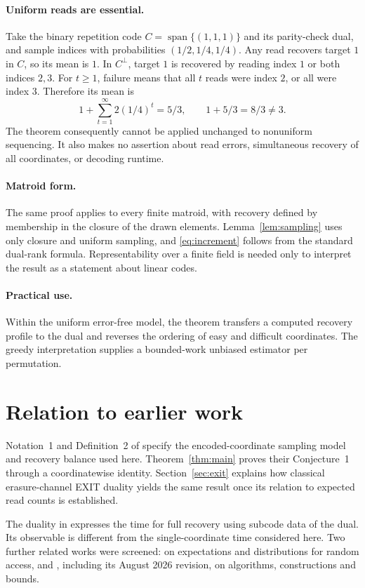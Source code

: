 \documentclass[11pt]{article}
\theoremstyle{remark}
\newcommand{\spn}{\operatorname{span}}
\begin{document}
\paragraph{Uniform reads are essential.}
Take the binary repetition code $C=\spn\{(1,1,1)\}$ and its parity-check
dual, and sample indices with probabilities $(1/2,1/4,1/4)$. Any read
recovers target $1$ in $C$, so its mean is $1$. In $C^\perp$, target $1$
is recovered by reading index $1$ or both indices $2,3$. For $t\geq1$,
failure means that all $t$ reads were index $2$, or all were index $3$.
Therefore its mean is
\[
 1+\sum_{t=1}^\infty 2(1/4)^t=5/3,
 \qquad 1+5/3=8/3\ne3.
\]
The theorem consequently cannot be applied unchanged to nonuniform
sequencing. It also makes no assertion about read errors, simultaneous
recovery of all coordinates, or decoding runtime.

\paragraph{Matroid form.}
The same proof applies to every finite matroid, with recovery defined by
membership in the closure of the drawn elements. Lemma~\ref{lem:sampling}
uses only closure and uniform sampling, and \eqref{eq:increment} follows
from the standard dual-rank formula. Representability over a finite field
is needed only to interpret the result as a statement about linear codes.

\paragraph{Practical use.}
Within the uniform error-free model, the theorem transfers a computed
recovery profile to the dual and reverses the ordering of easy and difficult
coordinates. The greedy interpretation supplies a bounded-work unbiased
estimator per permutation.

\section{Relation to earlier work}
Notation~1 and Definition~2 of \cite{GBRY} specify the encoded-coordinate
sampling model and recovery balance used here. Theorem~\ref{thm:main}
proves their Conjecture~1 through a coordinatewise identity. Section~\ref{sec:exit}
explains how classical erasure-channel EXIT duality yields the same result
once its relation to expected read counts is established.

The duality in \cite[Section 4]{BRY} expresses the time for full recovery
using subcode data of the dual. Its observable is different from the
single-coordinate time considered here. Two further related works were
screened: \cite{Bodur} on expectations and distributions for random access,
and \cite{WY}, including its August 2026 revision, on algorithms,
constructions and bounds.
\end{document}
